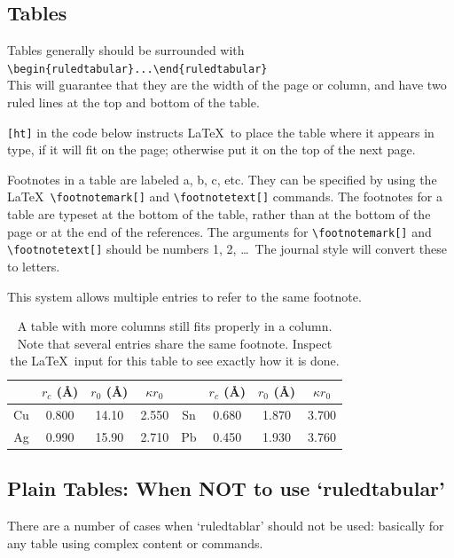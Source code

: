 \documentclass[preprint]{JASA}
\begin{document}
\subsection{\label{subsec:3:2} Tables}
Tables generally should be surrounded with
\verb+\begin{ruledtabular}...\end{ruledtabular}+\\
This will guarantee that they are the width of the
page or column, and have two ruled lines at the top
and bottom of the table.

\verb+[ht]+ in the code below instructs \LaTeX\ to place the table
where it appears in type, if it will fit on the page;
otherwise put it on the top of the next page.

Footnotes in a table are labeled a, b, c,
 etc.  They can
be  specified  by  using  the  \LaTeX\
\verb+\footnotemark[]+
and
\verb+\footnotetext[]+ commands.
The  footnotes  for  a  table  are  typeset  at  the
bottom  of  the  table,  rather  than  at  the  bottom  of  the
page or at the end of the references.  The arguments for
\verb+\footnotemark[]+
and
\verb+\footnotetext[]+
should be numbers
1, 2, \ldots\  The journal style will convert these to letters.

This system allows
multiple entries to refer to the same
footnote.   


\begin{table}[ht]
\caption{\label{tab:table1}A table with more columns still fits
properly in a column. Note that several entries share the same
footnote. Inspect the \LaTeX\ input for this table to see
exactly how it is done.}

\begin{ruledtabular}
\begin{tabular}{cccccccc}
 &$r_c$ (\AA)\footnotemark[1]&$r_0$ (\AA)&$\kappa r_0$&
 &$r_c$ (\AA) &$r_0$ (\AA)&$\kappa r_0$\\
\hline
Cu& 0.800 & 14.10 & 2.550 &Sn\footnotemark[1]
& 0.680 & 1.870 & 3.700 \\
Ag& 0.990 & 15.90 & 2.710 &Pb\footnotemark[2]
& 0.450 & 1.930 & 3.760 \\
\end{tabular}
\end{ruledtabular}
\end{table}
\clearpage
\subsection{Plain Tables: When NOT to use `ruledtabular'}
There are a number of cases when `ruledtablar' should not
be used: basically for any table using complex content or 
commands.
\end{document}
